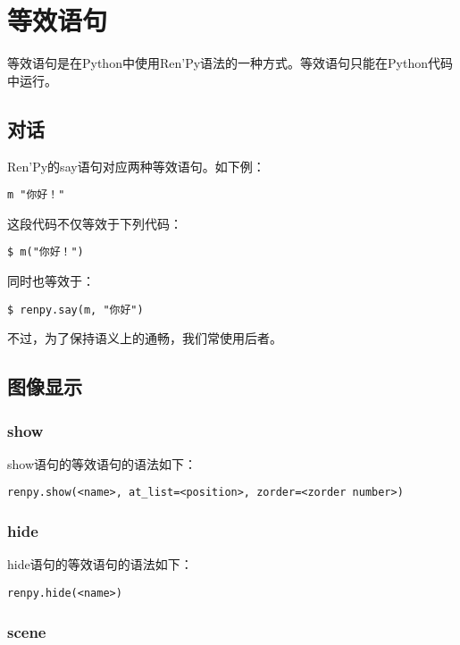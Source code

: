 \documentclass[../../Main.tex]{subfiles}
\begin{document}
\section{等效语句}
等效语句是在Python中使用Ren'Py语法的一种方式。等效语句只能在Python代码中运行。

\subsection{对话}
Ren'Py的say语句对应两种等效语句。如下例：

\begin{lstlisting}
m "你好！"
\end{lstlisting}

这段代码不仅等效于下列代码：

\begin{lstlisting}
$ m("你好！")
\end{lstlisting}

同时也等效于：

\begin{lstlisting}
$ renpy.say(m, "你好")
\end{lstlisting}

不过，为了保持语义上的通畅，我们常使用后者。

\subsection{图像显示}

\subsubsection{show}

show语句的等效语句的语法如下：

\begin{lstlisting}
renpy.show(<name>, at_list=<position>, zorder=<zorder number>)
\end{lstlisting}

\subsubsection{hide}

hide语句的等效语句的语法如下：

\begin{lstlisting}
renpy.hide(<name>)
\end{lstlisting}

\subsubsection{scene}
\end{document}
